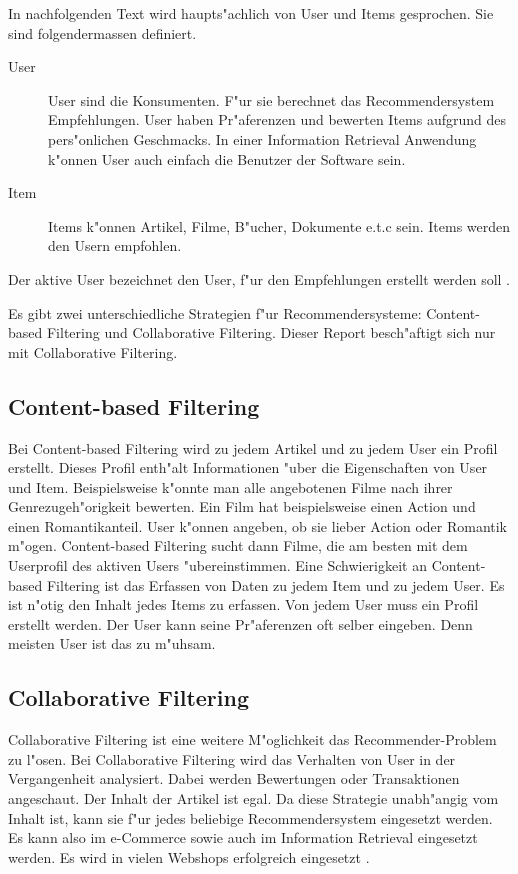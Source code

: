 \documentclass[a4paper, 12pt]{article}
\begin{document}
In nachfolgenden Text wird haupts"achlich von User und Items gesprochen. Sie sind folgendermassen definiert.

\begin{description}
\item[User] User sind die Konsumenten. F"ur sie berechnet das Recommendersystem Empfehlungen. 
User haben Pr"aferenzen und bewerten Items aufgrund des pers"onlichen Geschmacks. In einer Information Retrieval Anwendung k"onnen User auch einfach die Benutzer der Software sein.
\item[Item] 
Items k"onnen Artikel, Filme, B"ucher, Dokumente e.t.c sein. Items werden den Usern empfohlen.
\end{description}

Der aktive User bezeichnet den User, f"ur den Empfehlungen erstellt werden soll \cite{jannach11}.

Es gibt zwei unterschiedliche Strategien f"ur Recommendersysteme: Content-based Filtering und Collaborative Filtering. Dieser Report besch"aftigt sich nur mit Collaborative Filtering. 

\subsection{Content-based Filtering}
\label{sec:contentbased}

Bei Content-based Filtering wird zu jedem Artikel und zu jedem User ein Profil erstellt. Dieses Profil enth"alt Informationen "uber die Eigenschaften von User und Item. Beispielsweise k"onnte man alle angebotenen Filme nach ihrer Genrezugeh"origkeit bewerten. Ein Film hat beispielsweise einen Action und einen Romantikanteil. User k"onnen angeben, ob sie lieber Action oder Romantik m"ogen. Content-based Filtering sucht dann Filme, die am besten mit dem Userprofil des aktiven Users "ubereinstimmen. Eine Schwierigkeit an Content-based Filtering ist das Erfassen von Daten zu jedem Item und zu jedem User. Es ist n"otig den Inhalt jedes Items zu erfassen. Von jedem User muss ein Profil erstellt werden. Der User kann seine Pr"aferenzen oft selber eingeben. Denn meisten User ist das zu m"uhsam.

\subsection{Collaborative Filtering}
\label{sec:collaborativefiltering}

Collaborative Filtering ist eine weitere M"oglichkeit das Re\-commender-Prob\-lem zu l"osen. Bei Collaborative Filtering wird das Verhalten von User in der Vergangenheit analysiert. Dabei werden Bewertungen oder Transaktionen angeschaut. Der Inhalt der Artikel ist egal. Da diese Strategie unabh"angig vom Inhalt ist, kann sie f"ur jedes beliebige Recommendersystem eingesetzt werden. Es kann also im e-Commerce sowie auch im Information Retrieval eingesetzt werden.  Es wird in vielen Webshops erfolgreich eingesetzt \cite{sarwar01}. 
\end{document}

